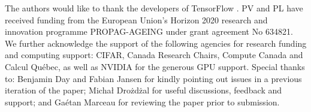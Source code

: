 \documentclass{article} \usepackage{iclr2018_conference,times}
\begin{document}
The authors would like to thank the developers of TensorFlow \citep{tensorflow2015-whitepaper}. PV and PL have received funding from the European Union's Horizon 2020 research and innovation programme PROPAG-AGEING under grant agreement No 634821. We further acknowledge the support of the following agencies for research funding and computing support: CIFAR, Canada Research Chairs, Compute Canada and Calcul Qu\'{e}bec, as well as NVIDIA for the generous GPU support. Special thanks to: Benjamin Day and Fabian Jansen for kindly pointing out issues in a previous iteration of the paper; Micha\l{} Dro\.{z}d\.{z}al for useful discussions, feedback and support; and Ga\'{e}tan Marceau for reviewing the paper prior to submission.





\end{document}

